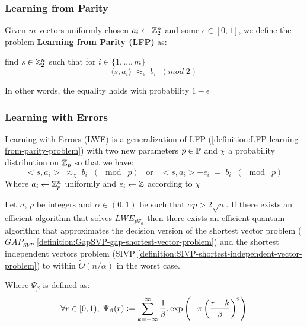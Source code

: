 \documentclass[a4paper,12pt]{article}
\begin{document}
\subsubsection{Learning from Parity}
\label{sec:org9564d09}
 \begin{definition}
  \label{definition:LFP-learning-from-parity-problem}
  Given $m$ vectors uniformly chosen  $a_i \gets \Z^n_2$ and some $\epsilon \in [0,1]$, we
  define the problem \textbf{Learning from Parity (LFP)} as:

  find $s \in \Z^n_2$ such that for $i \in \{1,\dots,m\}$
     $$ \langle{s, a_i}\rangle \; \approx_\epsilon \; b_i \;\; (mod\; 2) $$

     In other words, the equality holds with probability $1 - \epsilon$

\end{definition}

\subsubsection{Learning with Errors}
\label{sec:orgc6c520c}
\begin{definition}\label{definition:LWE-learning-with-errors-problem}
  Learning with Errors (LWE) is a generalization of LFP (\ref{definition:LFP-learning-from-parity-problem}) with two new parameters $p \in \P$ and $\chi$ a probability distribution on $\Z_p$ so that we have:
\[
  <s, a_i> \; \approx_\chi \; b_i \;\; (\mod\; p) \;\;\; \text{or} \;\;\; <s, a_i> + e_i \; = \;  b_i \;\; (\mod\; p) 
    \]
     Where $a_i \gets \Z^n_p$ uniformly and $e_i \gets \Z$ according to $\chi$

\end{definition}

\begin{theorem}
  Let $n$, $p$ be integers and $\alpha \in (0, 1)$ be such that $\alpha p > 2\sqrt{n}$. If
  there exists an efficient algorithm that solves $LWE_{p \Psi_\alpha}$ then there
  exists an efficient quantum algorithm that approximates the decision version
  of the shortest vector problem ($GAP_{SVP}$ \ref{definition:GapSVP-gap-shortest-vector-problem}) and the
  shortest independent vectors problem (SIVP \ref{definition:SIVP-shortest-independent-vector-problem}) to within
  $\tilde{O}(n/\alpha)$ in the worst case.

  Where $\Psi_\beta$ is defined as:
  $$
  \forall r \in [0,1), \; \Psi_\beta(r) \defsym \sum_{k=-\infty}^\infty{\frac{1}{\beta} . \exp{\left( -\pi \left( \frac{r-k}{\beta} \right)^2 \right)}}
  $$
\end{theorem}
\end{document}
